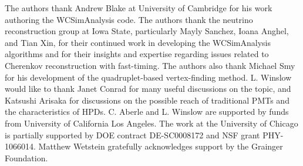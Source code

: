 \documentclass[cits]{JINST}
\begin{document}
\acknowledgments
The authors thank Andrew Blake at University of Cambridge for his work
authoring the WCSimAnalysis code. The authors thank the neutrino
reconstruction group at Iowa State, particularly Mayly Sanchez, Ioana
Anghel, and Tian Xin, for their continued work in developing the
WCSimAnalysis algorithms and for their insights and expertise
regarding issues related to Cherenkov reconstruction with
fast-timing. The authors also thank Michael Smy for his development of
the quadruplet-based vertex-finding method. L. Winslow would like to
thank Janet Conrad for many useful discussions on the topic, and
Katsushi Arisaka for discussions on the possible reach of traditional PMTs
and the characteristics of HPDs. C. Aberle and L. Winslow are
supported by funds from University of California Los Angeles. The work
at the University of Chicago is partially supported by DOE
contract DE-SC0008172 and NSF grant PHY-1066014. Matthew Wetstein gratefully
acknowledges support by the Grainger Foundation.

\newpage


 
\end{document}

